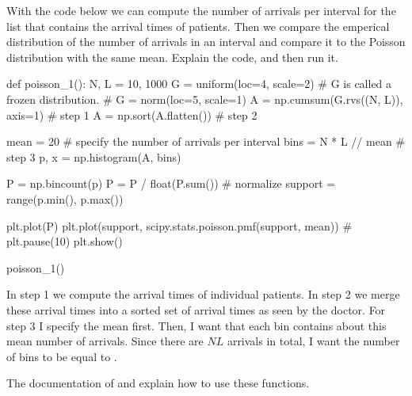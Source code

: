 \begin{exercise}
  With the code below we can compute the number of arrivals per interval for the list  that contains the arrival times of patients.
  Then we compare the emperical distribution of the number of arrivals in an interval  and compare it to the Poisson distribution with the same mean. Explain the code, and then run it.
\begin{pyverbatim}
def poisson_1():
    N, L = 10, 1000
    G = uniform(loc=4, scale=2)  # G is called a frozen distribution.
    # G = norm(loc=5, scale=1)
    A = np.cumsum(G.rvs((N, L)), axis=1) # step 1
    A = np.sort(A.flatten()) # step 2

    mean = 20  # specify the number of arrivals per interval
    bins = N * L // mean # step 3
    p, x = np.histogram(A, bins)

    P = np.bincount(p)
    P = P / float(P.sum())  # normalize
    support = range(p.min(), p.max())

    plt.plot(P)
    plt.plot(support, scipy.stats.poisson.pmf(support, mean))
    # plt.pause(10)
    plt.show()

poisson_1()
\end{pyverbatim}
  \begin{solution}
    In step 1 we compute the arrival times of individual patients.
    In step 2 we merge these arrival times into a sorted set of arrival times as seen by the doctor.
    For step 3 I specify the mean first.
    Then, I want that each bin contains about this mean number of arrivals. Since there are $NL$ arrivals in total, I want the number of bins to be equal to .

    The documentation of  and  explain how to use these functions.
  \end{solution}
\end{exercise}

